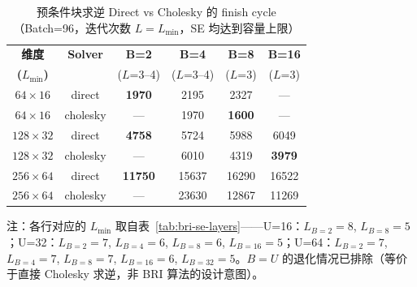    \begin{table}[H]
        \centering
        \caption{预条件块求逆 Direct vs Cholesky 的 finish cycle（Batch=96，迭代次数
        $L=L_{\min}$，SE 均达到容量上限）}
        \label{tab:bri-precond-cmp}
        \begin{tabular}{c c c c c c}
            \toprule \textbf{维度}   & \textbf{Solver} & \textbf{B=2}   & \textbf{B=4} & \textbf{B=8}  & \textbf{B=16} \\
            \textbf{($L_{\min}$)}  &                 & ($L$=3--4)     & ($L$=3--4)   & ($L$=3)       & ($L$=3)       \\
            \midrule $64\times16$  & direct          & \textbf{1970}  & 2195         & 2327          & —             \\
            $64\times16$           & cholesky        & —              & 1970         & \textbf{1600} & —             \\
            \midrule $128\times32$ & direct          & \textbf{4758}  & 5724         & 5988          & 6049          \\
            $128\times32$          & cholesky        & —              & 6010         & 4319          & \textbf{3979} \\
            \midrule $256\times64$ & direct          & \textbf{11750} & 15637        & 16290         & 16522         \\
            $256\times64$          & cholesky        & —              & 23630        & 12867         & 11269         \\
            \bottomrule
        \end{tabular}
    \end{table}

    注：各行对应的 $L_{\min}$ 取自表~\ref{tab:bri-se-layers}——U=16：$L_{B=2}=8$,
    $L_{B=8}=5$；U=32：$L_{B=2}=7$, $L_{B=4}=6$, $L_{B=8}=6$, $L_{B=16}=5$；U=64：$L
    _{B=2}=7$, $L_{B=4}=7$, $L_{B=8}=7$, $L_{B=16}=6$, $L_{B=32}=5$。$B=U$ 的退化情况已排除（等价于直接
    Cholesky 求逆，非 BRI 算法的设计意图）。

